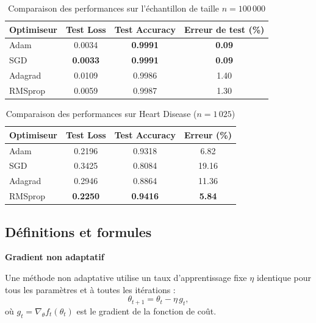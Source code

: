 \documentclass[a4paper,12pt]{article}
\begin{document}
\begin{table}[H]
\centering
\begin{tabular}{|l|c|c|c|}
\hline
\rowcolor{lightgray}
\textbf{Optimiseur} & \textbf{Test Loss} & \textbf{Test Accuracy} & \textbf{Erreur de test (\%)} \\
\hline
\rowcolor{lightgray!50}
Adam      & 0.0034 & \textbf{0.9991} & \textbf{0.09} \\
\hline
\rowcolor{lightgray!50}
SGD       & \textbf{0.0033} & \textbf{0.9991} & \textbf{0.09} \\
\hline
Adagrad   & 0.0109 & 0.9986 & 1.40 \\
\hline
RMSprop   & 0.0059 & 0.9987 & 1.30 \\
\hline
\end{tabular}
\caption{Comparaison des performances sur l'échantillon de taille $n=100\,000$}
\label{tab:results_100k}
\end{table}

\begin{table}[H]
\centering
\begin{tabular}{|l|c|c|c|}
\hline
\rowcolor{lightgray}
\textbf{Optimiseur} & \textbf{Test Loss} & \textbf{Test Accuracy} & \textbf{Erreur (\%)} \\
\hline
Adam      & 0.2196 & 0.9318 & 6.82 \\
\hline
SGD       & 0.3425 & 0.8084 & 19.16 \\
\hline
Adagrad   & 0.2946 & 0.8864 & 11.36 \\
\hline
\rowcolor{lightgray!50}
RMSprop   & \textbf{0.2250} & \textbf{0.9416} & \textbf{5.84} \\
\hline
\end{tabular}
\caption{Comparaison des performances sur Heart Disease ($n=1\,025$)}
\label{tab:heart}
\end{table}

\subsection{Définitions et formules}

\noindent\textbf{Gradient non adaptatif}\\
\par Une méthode non adaptative utilise un taux d'apprentissage fixe $\eta$ identique pour tous les paramètres
et à toutes les itérations :
\[
\theta_{t+1} = \theta_t - \eta \, g_t,
\]
où $g_t = \nabla_\theta f_t(\theta_t)$ est le gradient de la fonction de coût.\\
\end{document}
